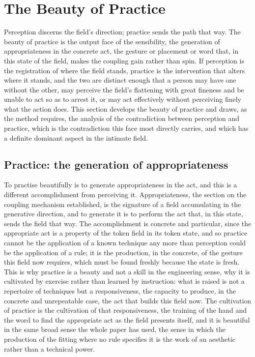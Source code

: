 \section{The Beauty of Practice}
\label{p22:sec:beauty-practice}

\noindent
Perception discerns the field's direction; practice sends the path that way. The beauty of practice is the output face of the sensibility, the generation of appropriateness in the concrete act, the gesture or placement or word that, in this state of the field, makes the coupling gain rather than spin. If perception is the registration of where the field stands, practice is the intervention that alters where it stands, and the two are distinct enough that a person may have one without the other, may perceive the field's flattening with great fineness and be unable to act so as to arrest it, or may act effectively without perceiving finely what the action does. This section develops the beauty of practice and draws, as the method requires, the analysis of the contradiction between perception and practice, which is the contradiction this face most directly carries, and which has a definite dominant aspect in the intimate field.

\subsection{Practice: the generation of appropriateness}
\label{p22:sub:practice-generation}

To practise beautifully is to generate appropriateness in the act, and this is a different accomplishment from perceiving it. Appropriateness, the section on the coupling mechanism established, is the signature of a field accumulating in the generative direction, and to generate it is to perform the act that, in this state, sends the field that way. The accomplishment is concrete and particular, since the appropriate act is a property of the token field in its token state, and so practice cannot be the application of a known technique any more than perception could be the application of a rule; it is the production, in the concrete, of the gesture this field now requires, which must be found freshly because the state is fresh. This is why practice is a beauty and not a skill in the engineering sense, why it is cultivated by exercise rather than learned by instruction: what is raised is not a repertoire of techniques but a responsiveness, the capacity to produce, in the concrete and unrepeatable case, the act that builds this field now. The cultivation of practice is the cultivation of that responsiveness, the training of the hand and the word to find the appropriate act as the field presents itself, and it is beautiful in the same broad sense the whole paper has used, the sense in which the production of the fitting where no rule specifies it is the work of an aesthetic rather than a technical power.

